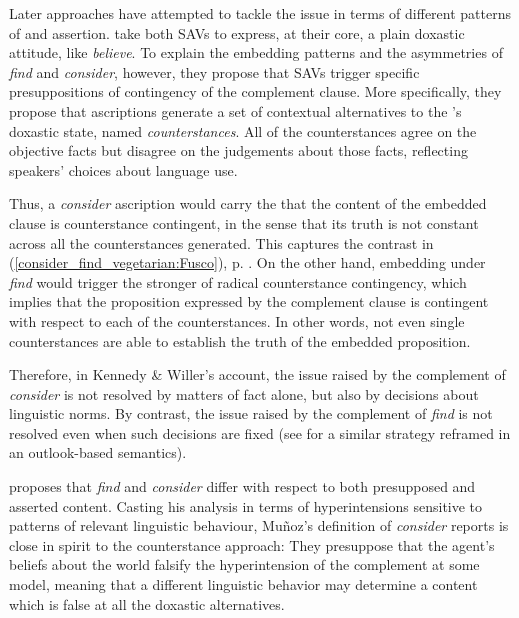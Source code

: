 \documentclass[output=paper,colorlinks,citecolor=brown]{langscibook}
\begin{document}
Later approaches have attempted to tackle the issue in terms of different patterns of  and assertion. \citet{kennedy_willer_2016,kennedy_willer_2022} take both SAVs to express, at their core, a plain doxastic attitude, like \textit{believe}. To explain the embedding patterns and the asymmetries of \textit{find} and \textit{consider}, however, they propose that SAVs trigger specific presuppositions of contingency of the complement clause. More specifically, they propose that  ascriptions generate a set of contextual alternatives to the 's doxastic state, named \textit{counterstances}. All of the counterstances agree on the objective facts but disagree on the judgements about those facts, reflecting speakers' choices about language use. 

Thus, a \textit{consider} ascription would carry the  that the content of the embedded clause is counterstance contingent, in the sense that its truth is not constant across all the counterstances generated. This captures the contrast in (\ref{consider_find_vegetarian:Fusco}), p. \pageref{consider_find_vegetarian:Fusco}.
On the other hand, embedding under \textit{find} would trigger the stronger  of radical counterstance contingency, which implies that the proposition expressed by the complement clause is contingent with respect to each of the counterstances. In other words, not even single counterstances are able to establish the truth of the embedded proposition.
 
Therefore, in Kennedy \& Willer's account, the issue raised by the complement of \textit{consider} is not resolved by matters of fact alone, but also by decisions about linguistic norms. By contrast, the issue raised by the complement of \textit{find} is not resolved even when such decisions are fixed (see \citealt{coppock_2018} for a similar strategy reframed in an outlook-based semantics).

\citet{munoz2019} proposes that \textit{find} and \textit{consider} differ with respect to both presupposed and asserted content. Casting his analysis in terms of hyperintensions sensitive to patterns of relevant linguistic behaviour, Muñoz’s definition of \textit{consider} reports is close in spirit to the counterstance approach: They presuppose that the agent’s beliefs about the world falsify the hyperintension of the complement at some model, meaning that a different linguistic behavior may determine a content which is false at all the doxastic alternatives. 
\end{document}
